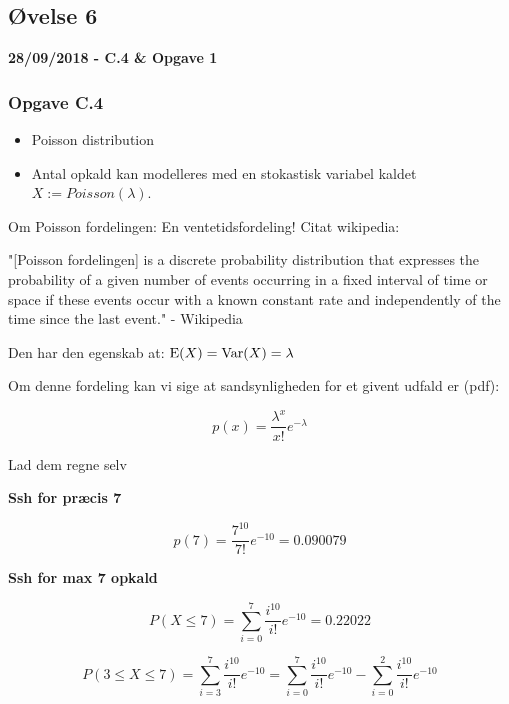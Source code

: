 \horizline

\subsection{Øvelse 6}

\textbf{28/09/2018 - C.4 \& Opgave 1}

\subsubsection{Opgave C.4}

\begin{itemize}
    \item Poisson distribution
    \item Antal opkald kan modelleres med en stokastisk variabel kaldet $X:= Poisson(\lambda)$.
\end{itemize}

Om Poisson fordelingen:
En ventetidsfordeling! Citat wikipedia:

\begin{displayquote}
"[Poisson fordelingen] is a discrete probability distribution that expresses the probability of a given number of events occurring in a fixed interval of time or space if these events occur with a known constant rate and independently of the time since the last event." - Wikipedia
\end{displayquote}

Den har den egenskab at:
$\text{E}(X) = \text{Var}(X) = \lambda$

Om denne fordeling kan vi sige at sandsynligheden for et givent udfald er (pdf):

\begin{equation}
    p(x) = \frac{\lambda^x}{x!}e^{-\lambda}
\end{equation}

Lad dem regne selv

\textbf{Ssh for præcis 7}

\begin{equation}
    p(7) = \frac{7^{10}}{7!}e^{-10} = 0.090079 
\end{equation}

\textbf{Ssh for max 7 opkald}

\begin{equation}
    P(X \leq 7) = \sum_{i=0}^7 \frac{i^{10}}{i!}e^{-10} = 0.22022
\end{equation}

\begin{equation}
    P(3 \leq X \leq 7) = \sum_{i=3}^7 \frac{i^{10}}{i!}e^{-10} = \sum_{i=0}^7 \frac{i^{10}}{i!}e^{-10} - \sum_{i=0}^2 \frac{i^{10}}{i!}e^{-10} 
\end{equation}

